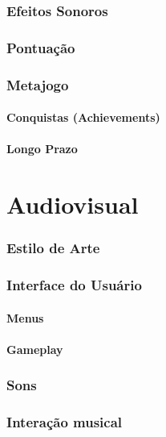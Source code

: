\documentclass[11pt]{article}
\begin{document}
\section{Efeitos Sonoros}

\section{Pontuação}

\section{Metajogo}
\subsection{Conquistas (Achievements)}
\subsection{Longo Prazo}

\part{Audiovisual}
\section{Estilo de Arte}

\section{Interface do Usuário}
\subsection{Menus}

\subsection{Gameplay}

\section{Sons}

\section{Interação musical}
\end{document}
